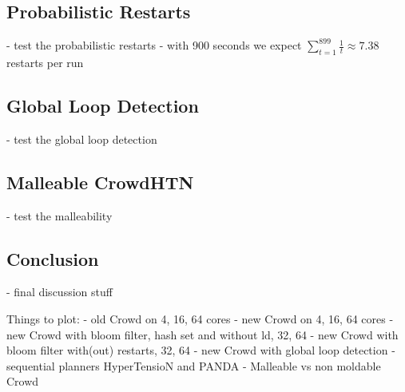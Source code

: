 \subsection{Probabilistic Restarts}
\label{eval: restarts}
- test the probabilistic restarts
- with 900 seconds we expect $\sum_{t=1}^{899} \frac{1}{t} \approx 7.38$ restarts per run


\subsection{Global Loop Detection}
\label{eval: global loop}
- test the global loop detection

\subsection{Malleable CrowdHTN}
\label{eval: malleable}
- test the malleability

\subsection{Conclusion}
\label{eval: conclusion}
- final discussion stuff

Things to plot:
- old Crowd on 4, 16, 64 cores
- new Crowd on 4, 16, 64 cores
- new Crowd with bloom filter, hash set and without ld, 32, 64
- new Crowd with bloom filter with(out) restarts, 32, 64
- new Crowd with global loop detection
- sequential planners HyperTensioN and PANDA
- Malleable vs non moldable Crowd

